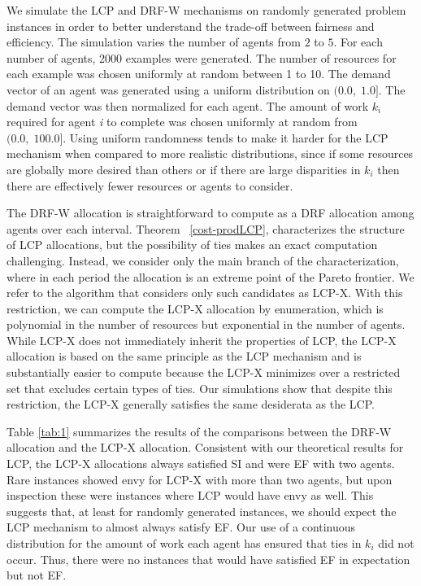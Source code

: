 \documentclass[letterpaper]{article} %
\theoremstyle{definition}
\begin{document}
We simulate the LCP and DRF-W mechanisms on randomly generated problem instances in order to better understand the trade-off between fairness and efficiency. The simulation varies the number of agents from $2$ to $5$. For each number of agents, 2000 examples were generated. The number of resources for each example was chosen uniformly at random between 1 to 10. The demand vector of an agent was generated using a uniform distribution on $(0.0, \; 1.0]$. The demand vector was then normalized for each agent. The amount of work $k_{i}$ required for agent \textit{i} to complete was chosen uniformly at random from $(0.0, \; 100.0]$. Using uniform randomness tends to make it harder for the LCP mechanism when compared to more realistic distributions, since if some resources are globally more desired than others or if there are large disparities in $k_{i}$ then there are effectively fewer resources or agents to consider.

The DRF-W allocation is straightforward to compute as a DRF allocation among agents over each interval. Theorem~ \ref{cost-prodLCP}, characterizes the structure of LCP allocations, but the possibility of ties makes an exact computation challenging. Instead, we consider only the main branch of the characterization, where in each period the allocation is an extreme point of the Pareto frontier. We refer to the algorithm that considers only such candidates as LCP-X. With this restriction, we can compute the LCP-X allocation by enumeration, which is polynomial in the number of resources but exponential in the number of agents. While LCP-X does not immediately inherit the properties of LCP, the LCP-X allocation is based on the same principle as the LCP mechanism and is substantially easier to compute because the LCP-X minimizes over a restricted set that excludes certain types of ties. Our simulations show that despite this restriction,  the LCP-X generally satisfies the same desiderata as the LCP.


Table \ref{tab:1} summarizes the results of the comparisons between the DRF-W allocation and the LCP-X allocation. Consistent with our theoretical results for LCP, the LCP-X allocations always satisfied SI and were EF with two agents. Rare instances showed envy for LCP-X with more than two agents, but upon inspection these were instances where LCP would have envy as well.  This suggests that, at least for randomly generated instances, we should expect the LCP mechanism to almost always satisfy EF.  Our use of a continuous distribution for the amount of work each agent has ensured that ties in $k_i$ did not occur. Thus, there were no instances that would have satisfied EF in expectation but not EF.
\end{document}
